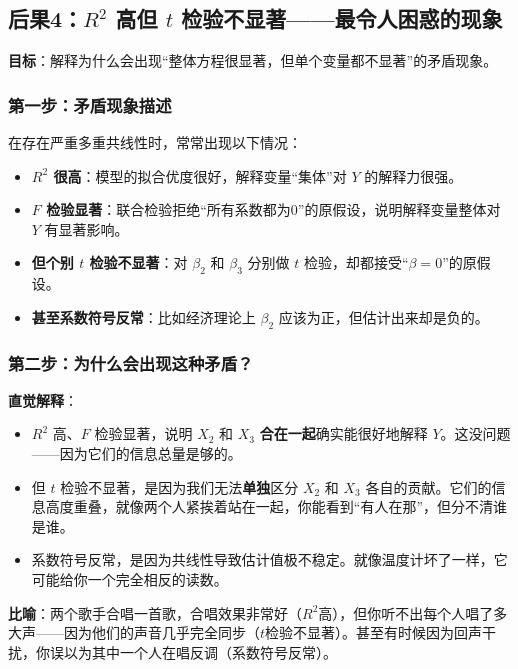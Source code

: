\documentclass[12pt,a4paper]{ctexart}
\begin{document}
\subsection{后果4：$R^2$ 高但 $t$ 检验不显著——最令人困惑的现象}

\textbf{目标}：解释为什么会出现“整体方程很显著，但单个变量都不显著”的矛盾现象。

\subsubsection{第一步：矛盾现象描述}

在存在严重多重共线性时，常常出现以下情况：

\begin{itemize}
    \item \textbf{$R^2$ 很高}：模型的拟合优度很好，解释变量“集体”对 $Y$ 的解释力很强。
    \item \textbf{$F$ 检验显著}：联合检验拒绝“所有系数都为0”的原假设，说明解释变量整体对 $Y$ 有显著影响。
    \item \textbf{但个别 $t$ 检验不显著}：对 $\beta_2$ 和 $\beta_3$ 分别做 $t$ 检验，却都接受“$\beta = 0$”的原假设。
    \item \textbf{甚至系数符号反常}：比如经济理论上 $\beta_2$ 应该为正，但估计出来却是负的。
\end{itemize}

\subsubsection{第二步：为什么会出现这种矛盾？}

\textbf{直觉解释}：

\begin{itemize}
    \item $R^2$ 高、$F$ 检验显著，说明 $X_2$ 和 $X_3$ \textbf{合在一起}确实能很好地解释 $Y$。这没问题——因为它们的信息总量是够的。
    \item 但 $t$ 检验不显著，是因为我们无法\textbf{单独}区分 $X_2$ 和 $X_3$ 各自的贡献。它们的信息高度重叠，就像两个人紧挨着站在一起，你能看到“有人在那”，但分不清谁是谁。
    \item 系数符号反常，是因为共线性导致估计值极不稳定。就像温度计坏了一样，它可能给你一个完全相反的读数。
\end{itemize}

\textbf{比喻}：两个歌手合唱一首歌，合唱效果非常好（$R^2$高），但你听不出每个人唱了多大声——因为他们的声音几乎完全同步（$t$检验不显著）。甚至有时候因为回声干扰，你误以为其中一个人在唱反调（系数符号反常）。
\end{document}
